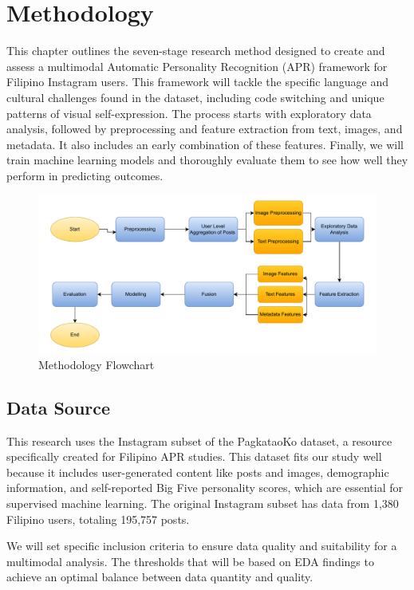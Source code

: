 \chapter{Methodology}
\label{sec:methodology}

This chapter outlines the seven-stage research method designed to create and assess a multimodal Automatic Personality Recognition (APR) framework for Filipino Instagram users. This framework will tackle the specific language and cultural challenges found in the dataset, including code switching and unique patterns of visual self-expression. The process starts with exploratory data analysis, followed by preprocessing and feature extraction from text, images, and metadata. It also includes an early combination of these features. Finally, we will train machine learning models and thoroughly evaluate them to see how well they perform in predicting outcomes.

\begin{figure}[H]
	\centering
	\includegraphics[width=\textwidth]{"figures/Methodology-Flowchart.pdf"}
	\caption{Methodology Flowchart}
	\label{fig:methodology_pipeline}
\end{figure}

\section{Data Source}
\label{sec:data}
This research uses the Instagram subset of the PagkataoKo dataset, a resource specifically created for Filipino APR studies. This dataset fits our study well because it includes user-generated content like posts and images, demographic information, and self-reported Big Five personality scores, which are essential for supervised machine learning. The original Instagram subset has data from 1,380 Filipino users, totaling 195,757 posts. 

We will set specific inclusion criteria to ensure data quality and suitability for a multimodal analysis. The  thresholds that will be based on EDA findings to achieve an optimal balance between data quantity and quality. 

